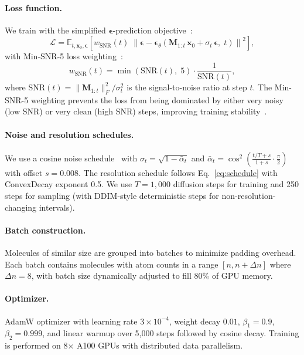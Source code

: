 \documentclass[11pt]{article}
\newcommand{\vx}{\mathbf{x}}
\newcommand{\ve}{\boldsymbol{\epsilon}}
\newcommand{\mM}{\mathbf{M}}
\newcommand{\expect}{\mathbb{E}}
\begin{document}
\paragraph{Loss function.} We train with the simplified $\ve$-prediction objective~\cite{ho2020ddpm}:
\begin{equation}
    \mathcal{L} = \expect_{t, \vx_0, \ve}\!\left[w_{\text{SNR}}(t)\;\left\|\ve - \ve_\theta\!\left(\mM_{1:t}\,\vx_0 + \sigma_t\,\ve,\; t\right)\right\|^2\right],
\end{equation}
with Min-SNR-5 loss weighting~\cite{hang2023minsnr}:
\begin{equation}
    w_{\text{SNR}}(t) = \min\!\left(\text{SNR}(t),\; 5\right) \cdot \frac{1}{\text{SNR}(t)},
\end{equation}
where $\text{SNR}(t) = \|\mM_{1:t}\|_F^2 / \sigma_t^2$ is the signal-to-noise ratio at step $t$. The Min-SNR-5 weighting prevents the loss from being dominated by either very noisy (low SNR) or very clean (high SNR) steps, improving training stability~\cite{hang2023minsnr}.

\paragraph{Noise and resolution schedules.} We use a cosine noise schedule~\cite{nichol2021improved} with $\sigma_t = \sqrt{1 - \bar{\alpha}_t}$ and $\bar{\alpha}_t = \cos^2\!\left(\frac{t/T + s}{1+s}\cdot\frac{\pi}{2}\right)$ with offset $s = 0.008$. The resolution schedule follows Eq.~\eqref{eq:schedule} with ConvexDecay exponent 0.5. We use $T = 1{,}000$ diffusion steps for training and 250 steps for sampling (with DDIM-style deterministic steps for non-resolution-changing intervals).

\paragraph{Batch construction.} Molecules of similar size are grouped into batches to minimize padding overhead. Each batch contains molecules with atom counts in a range $[n, n + \Delta n]$ where $\Delta n = 8$, with batch size dynamically adjusted to fill 80\% of GPU memory.

\paragraph{Optimizer.} AdamW optimizer with learning rate $3 \times 10^{-4}$, weight decay $0.01$, $\beta_1 = 0.9$, $\beta_2 = 0.999$, and linear warmup over 5{,}000 steps followed by cosine decay. Training is performed on 8$\times$ A100 GPUs with distributed data parallelism.
\end{document}
